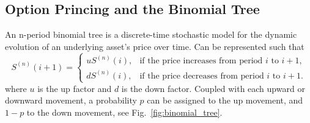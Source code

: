     \subsection{Option Princing and the Binomial Tree}
        \label{sec:bin_tree}

    An n-period binomial tree is a discrete-time stochastic model for the dynamic evolution of an
    underlying asset's price over time. Can be represented such that
    \begin{equation}
        S^{(n)}(i+1) =
            \begin{cases}
                u S^{(n)}(i), & \text{if the price increases from period } i \text{ to } i+1, \\
                d S^{(n)}(i), & \text{if the price decreases from period } i \text{ to } i+1.
            \end{cases}
        \label{eq:equation}
    \end{equation}
    where $u$ is the up factor and $d$ is the down factor. Coupled with each upward or downward movement,
    a probability $p$ can be assigned to the up movement, and $1-p$ to the down movement,
    see Fig.~\ref{fig:binomial_tree}.


